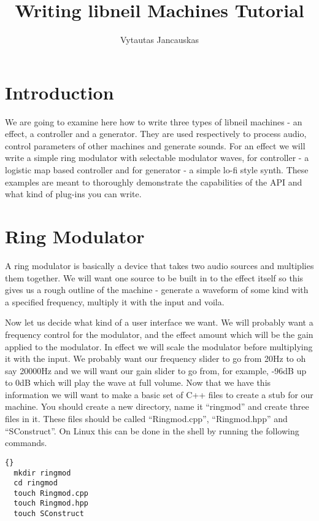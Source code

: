 \documentclass[a4paper, 12pt]{article}
\begin{document}
\title{Writing libneil Machines Tutorial}
\author{Vytautas Jancauskas}
\maketitle

\section{Introduction}
We are going to examine here how to write three types of libneil machines - an
effect, a controller and a generator. They are used respectively to
process audio, control parameters of other machines and generate
sounds. For an effect we will write a simple ring modulator with
selectable modulator waves, for controller - a logistic map based
controller and for generator - a simple lo-fi style synth. These
examples are meant to thoroughly demonstrate the capabilities of the
API and what kind of plug-ins you can write.

\section{Ring Modulator}

A ring modulator is basically a device that takes two audio sources
and multiplies them together. We will want one source to be built in
to the effect itself so this gives us a rough outline of the machine -
generate a waveform of some kind with a specified frequency, multiply
it with the input and voila.

Now let us decide what kind of a user interface we want. We will
probably want a frequency control for the modulator, and the effect
amount which will be the gain applied to the modulator. In effect we
will scale the modulator before multiplying it with the input. We
probably want our frequency slider to go from 20Hz to oh say 20000Hz
and we will want our gain slider to go from, for example, -96dB up to
0dB which will play the wave at full volume. Now that we have this
information we will want to make a basic set of C++ files to create a
stub for our machine. You should create a new directory, name it
``ringmod'' and create three files in it. These files should be called
``Ringmod.cpp'', ``Ringmod.hpp'' and ``SConstruct''. On Linux this can
be done in the shell by running the following commands.

\lstset{language=bash}

\begin{lstlisting}[frame=trbl]{}
  mkdir ringmod
  cd ringmod
  touch Ringmod.cpp
  touch Ringmod.hpp
  touch SConstruct
\end{lstlisting}
\end{document}
